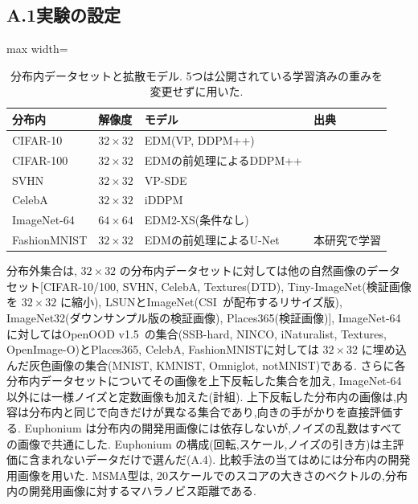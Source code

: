 \documentclass[MIRU,submit,onecolumn]{miru2025j}
\begin{document}
\subsection*{A.1\quad 実験の設定}
\begin{table}[h]\centering\footnotesize\setlength{\tabcolsep}{3pt}
\caption{分布内データセットと拡散モデル. 5つは公開されている学習済みの重みを変更せずに用いた.}
\label{tab:models}
\begin{adjustbox}{max width=\columnwidth}
\begin{tabular}{@{}llll@{}}\toprule
分布内 & 解像度 & モデル & 出典\\\midrule
CIFAR-10 & $32{\times}32$ & EDM(VP, DDPM++) & \cite{karras2022edm}\\
CIFAR-100 & $32{\times}32$ & EDMの前処理によるDDPM++ & \cite{chen2024robust}\\
SVHN & $32{\times}32$ & VP-SDE & \cite{kamkari2024geometric}\\
CelebA & $32{\times}32$ & iDDPM & \cite{nichol2021improved}\\
ImageNet-64 & $64{\times}64$ & EDM2-XS(条件なし) & \cite{karras2024edm2}\\
FashionMNIST & $32{\times}32$ & EDMの前処理によるU-Net & 本研究で学習\\
\bottomrule\end{tabular}
\end{adjustbox}
\end{table}
分布外集合は, $32{\times}32$ の分布内データセットに対しては他の自然画像のデータセット[CIFAR-10/100, SVHN, CelebA, Textures(DTD), Tiny-ImageNet(検証画像を $32{\times}32$ に縮小), LSUNとImageNet(CSI~\cite{tack2020csi}が配布するリサイズ版), ImageNet32(ダウンサンプル版の検証画像), Places365(検証画像)], ImageNet-64に対してはOpenOOD v1.5~\cite{zhang2023openood}の集合(SSB-hard, NINCO, iNaturalist, Textures, OpenImage-O)とPlaces365, CelebA, FashionMNISTに対しては $32{\times}32$ に埋め込んだ灰色画像の集合(MNIST, KMNIST, Omniglot, notMNIST)である.%
さらに各分布内データセットについてその画像を上下反転した集合を加え, ImageNet-64以外には一様ノイズと定数画像も加えた(計\nPairs{}組).%
上下反転した分布内の画像は,内容は分布内と同じで向きだけが異なる集合であり,向きの手がかりを直接評価する. %
Euphonium は分布内の開発用画像には依存しないが,ノイズの乱数はすべての画像で共通にした. %
Euphonium の構成(回転,スケール,ノイズの引き方)は主評価に含まれないデータだけで選んだ(A.4).%
比較手法の当てはめには分布内の開発用画像を用いた. %
MSMA型は, 20スケールでのスコアの大きさのベクトルの,分布内の開発用画像に対するマハラノビス距離である. %
\end{document}

